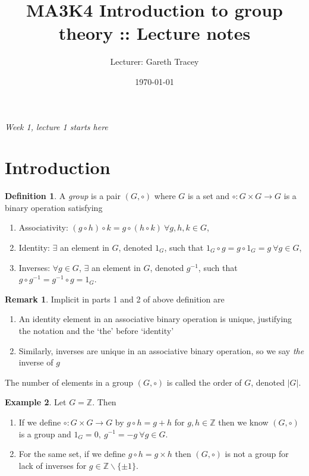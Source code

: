 \documentclass[a4paper]{article}
\title{MA3K4 Introduction to group theory :: Lecture notes}
\author{Lecturer: Gareth Tracey}
\date{\today}
\theoremstyle{definition}
\newtheorem{defn}{Definition}[subsection]
\newtheorem{example}[defn]{Example}
\newtheorem*{remark}{Remark}
\begin{document}
\maketitle
\thispagestyle{empty}

\tableofcontents
\thispagestyle{empty}
\newpage
\setcounter{page}{1}

\begin{flushright}
\textit{Week 1, lecture 1 starts here}
\end{flushright}

\section{Introduction}
\begin{defn}
A \textit{group} is a pair $(G,\circ)$ where $G$ is a set and $\circ:G\times G\rightarrow G$ is a binary operation satisfying
\begin{enumerate}
\item Associativity: $(g\circ h)\circ k = g\circ (h\circ k) \ \forall g,h,k \in G$,
\item Identity: $\exists$ an element in $G$, denoted $1_G$, such that $1_G\circ g = g\circ 1_G = g \ \forall g\in G$,
\item Inverses: $\forall g\in G$, $\exists$ an element in $G$, denoted $g^{-1}$, such that $g\circ g^{-1} = g^{-1}\circ g = 1_G$.
\end{enumerate}
\end{defn}

\begin{remark}
Implicit in parts 1 and 2 of above definition are
\begin{enumerate}
\item An identity element in an associative binary operation is unique, justifying the notation and the `the' before `identity'
\item Similarly, inverses are unique in an associative binary operation, so we say \textit{the} inverse of $g$
\end{enumerate}
The number of elements in a group $(G,\circ)$ is called the order of $G$, denoted $|G|$.
\end{remark}

\begin{example}
Let $G=\mathbb Z$. Then
\begin{enumerate}
\item If we define $\circ:G\times G\rightarrow G$ by $g\circ h=g+h$ for $g,h\in \mathbb Z$ then we know $(G,\circ)$ is a group and $1_G=0,\ g^{-1}=-g \ \forall g\in G$.
\item For the same set, if we define $g\circ h=g\times h$ then $(G,\circ)$ is not a group for lack of inverses for $g\in \mathbb Z \backslash \{\pm 1\}$.
\end{enumerate}
\end{example}
\end{document}
